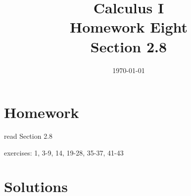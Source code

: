 \documentclass[letterpaper]{exam}
\title{Calculus I \\ Homework Eight \\ Section 2.8}
\author{}
\date{\today}
\begin{document}
  \maketitle

  \section{Homework}
    \begin{itemize*}
      \item read Section 2.8
      \item exercises: 1, 3-9, 14, 19-28, 35-37, 41-43
    \end{itemize*}

  \ifprintanswers

  \section{Solutions}
\end{document}
